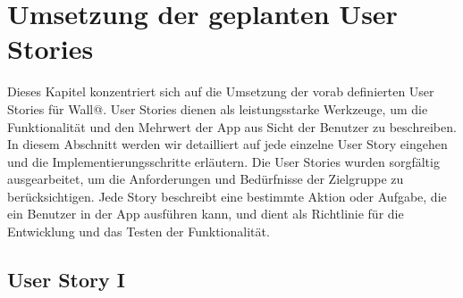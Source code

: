 \section{Umsetzung der geplanten User Stories}

Dieses Kapitel konzentriert sich auf die Umsetzung der vorab definierten User Stories für Wall@. 
User Stories dienen als leistungsstarke Werkzeuge, um die Funktionalität und den Mehrwert der App aus Sicht der Benutzer zu beschreiben. 
In diesem Abschnitt werden wir detailliert auf jede einzelne User Story eingehen und die Implementierungsschritte erläutern.
\newline
\newline
Die User Stories wurden sorgfältig ausgearbeitet, um die Anforderungen und Bedürfnisse der Zielgruppe zu berücksichtigen. 
Jede Story beschreibt eine bestimmte Aktion oder Aufgabe, die ein Benutzer in der App ausführen kann, und dient als Richtlinie 
für die Entwicklung und das Testen der Funktionalität.

\subsection{User Story I}